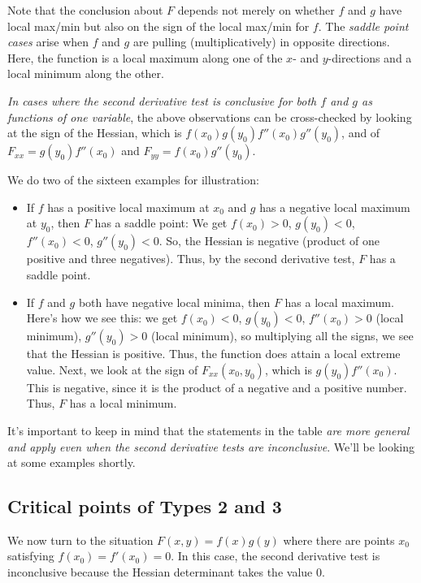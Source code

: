 \documentclass[10pt]{amsart}
\begin{document}
Note that the conclusion about $F$ depends not merely on whether $f$
and $g$ have local max/min but also on the sign of the local max/min
for $f$. The {\em saddle point cases} arise when $f$ and $g$ are
pulling (multiplicatively) in opposite directions. Here, the function
is a local maximum along one of the $x$- and $y$-directions and a
local minimum along the other.

{\em In cases where the second derivative test is conclusive for both
$f$ and $g$ as functions of one variable}, the above observations can
be cross-checked by looking at the sign of the Hessian, which is
$f(x_0)g(y_0)f''(x_0)g''(y_0)$, and of $F_{xx} = g(y_0)f''(x_0)$ and
$F_{yy} = f(x_0)g''(y_0)$.

We do two of the sixteen examples for illustration:

\begin{itemize}
\item If $f$ has a positive local maximum at $x_0$ and $g$ has a
  negative local maximum at $y_0$, then $F$ has a saddle point: We get
  $f(x_0) > 0$, $g(y_0) < 0$, $f''(x_0) < 0$, $g''(y_0) < 0$. So, the
  Hessian is negative (product of one positive and three
  negatives). Thus, by the second derivative test, $F$ has a saddle
  point.
\item If $f$ and $g$ both have negative local minima, then $F$ has a
  local maximum. Here's how we see this: we get $f(x_0) < 0$, $g(y_0)
  < 0$, $f''(x_0) > 0$ (local minimum), $g''(y_0) > 0$ (local
  minimum), so multiplying all the signs, we see that the Hessian is
  positive. Thus, the function does attain a local extreme
  value. Next, we look at the sign of $F_{xx}(x_0,y_0)$, which is
  $g(y_0)f''(x_0)$. This is negative, since it is the product of a
  negative and a positive number. Thus, $F$ has a local minimum.
\end{itemize}

It's important to keep in mind that the statements in the table {\em
are more general and apply even when the second derivative tests are
inconclusive}. We'll be looking at some examples shortly.

\subsection{Critical points of Types 2 and 3}

We now turn to the situation $F(x,y) = f(x)g(y)$ where there are
points $x_0$ satisfying $f(x_0) = f'(x_0) = 0$. In this case, the
second derivative test is inconclusive because the Hessian determinant
takes the value $0$.
\end{document}
